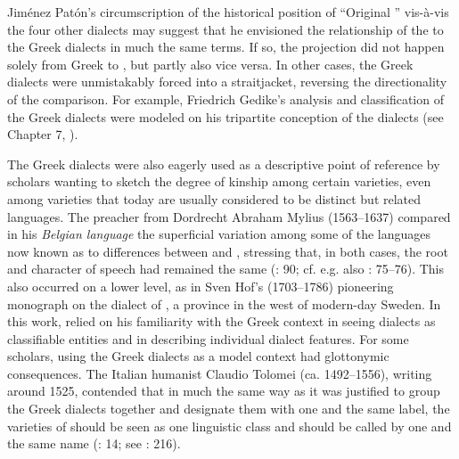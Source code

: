 Jiménez Patón’s circumscription of the historical position of “Original ” vis-à-vis the four other dialects may suggest that he envisioned the relationship of the  to the Greek dialects in much the same terms. If so, the projection did not happen solely from Greek to , but partly also vice versa. In other cases, the Greek dialects were unmistakably forced into a  straitjacket, reversing the directionality of the comparison. For example, Friedrich Gedike’s analysis and classification of the Greek dialects were modeled on his tripartite conception of the  dialects (see Chapter 7, ).

The Greek dialects were also eagerly used as a descriptive point of reference by scholars wanting to sketch the degree of kinship among certain  varieties, even among varieties that today are usually considered to be distinct but related languages. The preacher from Dordrecht Abraham Mylius (1563–1637) compared in his \textit{Belgian language} the superficial variation among some of the languages now known as  to differences between  and , stressing that, in both cases, the root and character of speech had remained the same (\citealt{Mylius1612}: 90; cf. e.g. also \citealt{Boxhorn1647}: 75–76). This also occurred on a lower level, as in Sven Hof’s (1703–1786) pioneering monograph on the dialect of , a province in the west of modern-day Sweden. In this work, \citet[esp. 12–13, 23]{Hof1772} relied on his familiarity with the Greek context in seeing dialects as classifiable entities and in describing individual dialect features. For some scholars, using the Greek dialects as a model context had glottonymic consequences. The Italian humanist Claudio Tolomei (ca. 1492–1556), writing around 1525, contended that in much the same way as it was justified to group the Greek dialects together and designate them with one and the same label, the varieties of  should be seen as one linguistic class and should be called by one and the same name (\citealt{Tolomei1555}: 14; see \citealt{Trovato1984}: 216).

